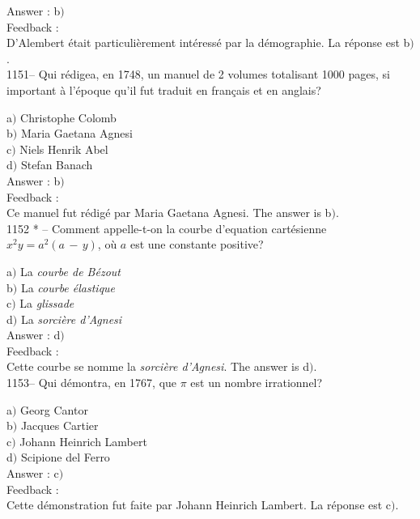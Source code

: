 \documentclass[letterpaper, 12pt]{article}
\begin{document}
Answer : b$)$\\

Feedback : \\
D'Alembert \'etait particuli\`erement int\'eress\'e par la d\'emographie. La
r\'eponse est b$)$.\\

1151-- Qui r\'edigea, en 1748, un manuel de 2 volumes totalisant
1000 pages, si important \`a l'\'epoque qu'il fut traduit en fran\c
cais et en anglais?

a$)$ Christophe Colomb \\
b$)$ Maria Gaetana Agnesi \\
c$)$ Niels Henrik Abel \\
d$)$ Stefan Banach  \\

Answer : b$)$\\

Feedback : \\
Ce manuel fut r\'edig\'e par Maria Gaetana Agnesi. The answer is b$)$.\\

1152 * -- Comment appelle-t-on la courbe d'equation cart\'esienne
$x^2y=a^2(a\,-\,y)$, o\`u $a$ est une constante positive?

a$)$ La {\sl courbe de B\'ezout} \\
b$)$ La {\sl courbe \'elastique}  \\
c$)$ La {\sl glissade} \\
d$)$ La {\sl sorci\`ere d'Agnesi}  \\

Answer : d$)$\\

Feedback : \\
Cette courbe se nomme la {\sl sorci\`ere d'Agnesi}. The answer is d$)$.\\

1153-- Qui d\'emontra, en 1767, que $\pi$ est un nombre irrationnel?

a$)$ Georg Cantor \\
b$)$ Jacques Cartier \\
c$)$ Johann Heinrich Lambert \\
d$)$ Scipione del Ferro\\

Answer : c$)$\\

Feedback : \\
Cette d\'emonstration fut faite par Johann Heinrich Lambert. La r\'eponse
est c$)$.\\
\end{document}
